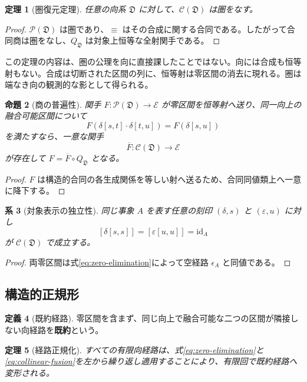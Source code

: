 \documentclass[a4paper,11pt]{ltjsarticle}
\theoremstyle{definition}
\newtheorem{definition}{定義}[section]
\theoremstyle{plain}
\newtheorem{theorem}[definition]{定理}
\newtheorem{proposition}[definition]{命題}
\newtheorem{corollary}[definition]{系}
\newcommand{\id}{\mathrm{id}}
\begin{document}
\begin{theorem}[圏復元定理]
任意の向系 $\mathfrak D$ に対して、$\mathcal C(\mathfrak D)$ は圏をなす。
\end{theorem}

\begin{proof}
$\mathcal P(\mathfrak D)$ は圏であり、$\equiv$ はその合成に関する合同である。したがって合同商は圏をなし、$Q_{\mathfrak D}$ は対象上恒等な全射関手である。
\end{proof}

この定理の内容は、圏の公理を向に直接課したことではない。向には合成も恒等射もない。合成は切断された区間の列に、恒等射は零区間の消去に現れる。圏は端なき向の観測的な影として得られる。

\begin{proposition}[商の普遍性]
関手 $F:\mathcal P(\mathfrak D)\to\mathcal E$ が零区間を恒等射へ送り、同一向上の融合可能区間について
\[
 F(\delta[s,t]\cdot\delta[t,u])
 =F(\delta[s,u])
\]
を満たすなら、一意な関手
\[
 \overline F:\mathcal C(\mathfrak D)\to\mathcal E
\]
が存在して $F=\overline F\circ Q_{\mathfrak D}$ となる。
\end{proposition}

\begin{proof}
$F$ は構造的合同の各生成関係を等しい射へ送るため、合同同値類上へ一意に降下する。
\end{proof}

\begin{corollary}[対象表示の独立性]
同じ事象 $A$ を表す任意の刻印 $(\delta,s)$ と $(\varepsilon,u)$ に対し
\[
 [\delta[s,s]]=[\varepsilon[u,u]]=\id_A
\]
が $\mathcal C(\mathfrak D)$ で成立する。
\end{corollary}

\begin{proof}
両零区間は式\eqref{eq:zero-elimination}によって空経路 $\epsilon_A$ と同値である。
\end{proof}

\subsection{構造的正規形}

\begin{definition}[既約経路]
零区間を含まず、同じ向上で融合可能な二つの区間が隣接しない向経路を\textbf{既約}という。
\end{definition}

\begin{theorem}[経路正規化]
すべての有限向経路は、式\eqref{eq:zero-elimination}と\eqref{eq:collinear-fusion}を左から繰り返し適用することにより、有限回で既約経路へ変形される。
\end{theorem}
\end{document}
